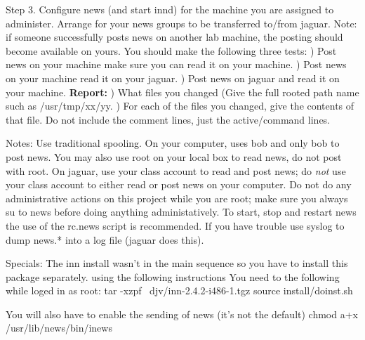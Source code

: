 Step 3. Configure news (and start {\ltt{}innd}) for the machine you are
assigned to administer.
Arrange for your news groups to be transferred to/from {\ltt{}jaguar}.
Note: if someone successfully posts news on another lab machine, the posting
should become available on yours.
You should make the following three tests:
\hfill{}) Post news on your machine make sure you can read it
on your machine.
\hfill{}) Post news on your machine read it on your {\ltt{}jaguar}.
\hfill{}) Post news on {\ltt{}jaguar} and read it on your machine.
\hfill\break
{\bf Report:}
\hfill{}) What files you changed (Give the full rooted path name such as
{\ltt{}/usr/tmp/xx/yy}.
\hfill{}) For each of the files you changed, give the contents of that file.
Do not include the comment lines, just the active/command lines.

Notes: Use traditional spooling. On your computer, uses {\ltt{}bob}
and only {\ltt{}bob} to post news. You may also use root on
your local box to read news, do not post with root.
On jaguar, use your class account to read and post news;
do {\it not} use your class account to either read or post news on your
computer. Do not do any administrative actions on this project
while you are root; make sure you always {\ltt{}su} to news before
doing anything administatively. To start, stop and restart news
the use of the {\ltt{}rc.news} script is recommended.
If you have trouble use syslog to dump {\ltt{}news.*} into a log file
({\ltt{}jaguar} does this).

Specials:
The inn install wasn't in the main sequence so you have to
install this package separately. using the following instructions
You need to the following while loged in as root:
\hfill\break
{\ltt{}tar -xzpf ~djv/inn-2.4.2-i486-1.tgz}
\hfill\break
{\ltt{}source install/doinst.sh}

You will also have to enable the sending of news (it's not the default)
\hfill\break
{\ltt{}chmod a+x /usr/lib/news/bin/inews}

\bye
